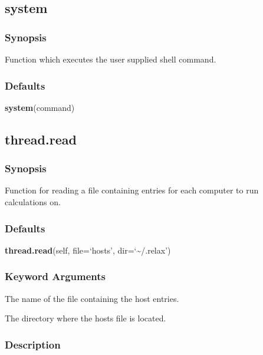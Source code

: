 



\newpage

\subsection{system}


\subsubsection{Synopsis}

Function which executes the user supplied shell command.

\subsubsection{Defaults}

\textsf{\textbf{system}(command)}



\newpage

\subsection{thread.read}


\subsubsection{Synopsis}

Function for reading a file containing entries for each computer to run calculations on.

\subsubsection{Defaults}

\textsf{\textbf{thread.read}(self, file=`hosts', dir=`\~{}/.relax')}


\subsubsection{Keyword Arguments}


  The name of the file containing the host entries.

  The directory where the hosts file is located.

\subsubsection{Description}

